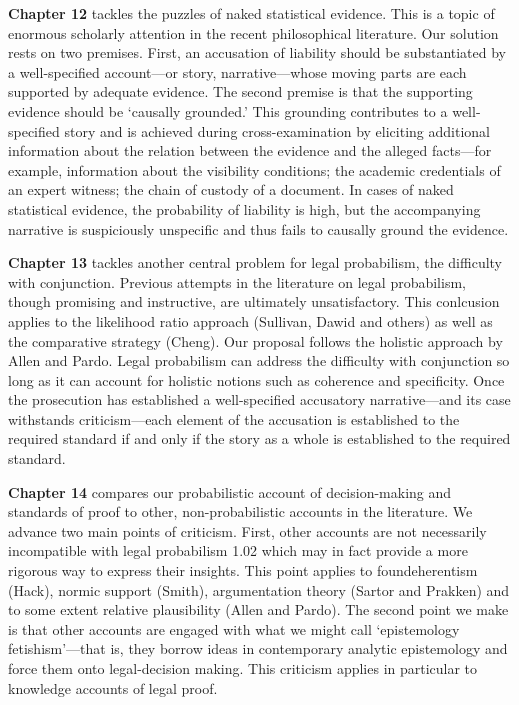 \documentclass[
  10pt,
  dvipsnames,enabledeprecatedfontcommands]{scrartcl}
\begin{document}
\textbf{Chapter 12} tackles the puzzles of naked statistical evidence.
This is a topic of enormous scholarly attention in the recent
philosophical literature. Our solution rests on two premises. First, an
accusation of liability should be substantiated by a well-specified
account---or story, narrative---whose moving parts are each supported by
adequate evidence. The second premise is that the supporting evidence
should be `causally grounded.' This grounding contributes to a
well-specified story and is achieved during cross-examination by
eliciting additional information about the relation between the evidence
and the alleged facts---for example, information about the visibility
conditions; the academic credentials of an expert witness; the chain of
custody of a document. In cases of naked statistical evidence, the
probability of liability is high, but the accompanying narrative is
suspiciously unspecific and thus fails to causally ground the evidence.

\textbf{Chapter 13} tackles another central problem for legal
probabilism, the difficulty with conjunction. Previous attempts in the
literature on legal probabilism, though promising and instructive, are
ultimately unsatisfactory. This conlcusion applies to the likelihood
ratio approach (Sullivan, Dawid and others) as well as the comparative
strategy (Cheng). Our proposal follows the holistic approach by Allen
and Pardo. Legal probabilism can address the difficulty with conjunction
so long as it can account for holistic notions such as coherence and
specificity. Once the prosecution has established a well-specified
accusatory narrative---and its case withstands criticism---each element
of the accusation is established to the required standard if and only if
the story as a whole is established to the required standard.

\textbf{Chapter 14} compares our probabilistic account of
decision-making and standards of proof to other, non-probabilistic
accounts in the literature. We advance two main points of criticism.
First, other accounts are not necessarily incompatible with legal
probabilism 1.02 which may in fact provide a more rigorous way to
express their insights. This point applies to foundeherentism (Hack),
normic support (Smith), argumentation theory (Sartor and Prakken) and to
some extent relative plausibility (Allen and Pardo). The second point we
make is that other accounts are engaged with what we might call
`epistemology fetishism'---that is, they borrow ideas in contemporary
analytic epistemology and force them onto legal-decision making. This
criticism applies in particular to knowledge accounts of legal proof.
\end{document}
